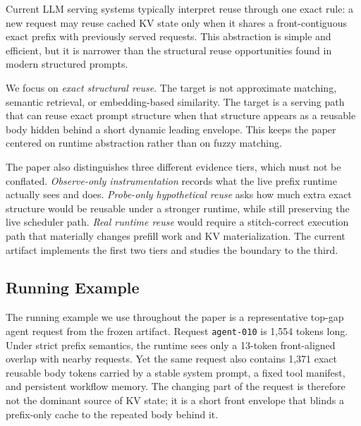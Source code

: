 \documentclass[conference]{IEEEtran}
\begin{document}
Current LLM serving systems typically interpret reuse through one exact rule: a new request may reuse cached KV state only when it shares a front-contiguous exact prefix with previously served requests. This abstraction is simple and efficient, but it is narrower than the structural reuse opportunities found in modern structured prompts.

We focus on \emph{exact structural reuse}. The target is not approximate matching, semantic retrieval, or embedding-based similarity. The target is a serving path that can reuse exact prompt structure when that structure appears as a reusable body hidden behind a short dynamic leading envelope. This keeps the paper centered on runtime abstraction rather than on fuzzy matching.

The paper also distinguishes three different evidence tiers, which must not be conflated. \emph{Observe-only instrumentation} records what the live prefix runtime actually sees and does. \emph{Probe-only hypothetical reuse} asks how much extra exact structure would be reusable under a stronger runtime, while still preserving the live scheduler path. \emph{Real runtime reuse} would require a stitch-correct execution path that materially changes prefill work and KV materialization. The current artifact implements the first two tiers and studies the boundary to the third.

\subsection{Running Example}

The running example we use throughout the paper is a representative top-gap agent request from the frozen artifact. Request \texttt{agent-010} is 1{,}554 tokens long. Under strict prefix semantics, the runtime sees only a 13-token front-aligned overlap with nearby requests. Yet the same request also contains 1{,}371 exact reusable body tokens carried by a stable system prompt, a fixed tool manifest, and persistent workflow memory. The changing part of the request is therefore not the dominant source of KV state; it is a short front envelope that blinds a prefix-only cache to the repeated body behind it.
\end{document}
